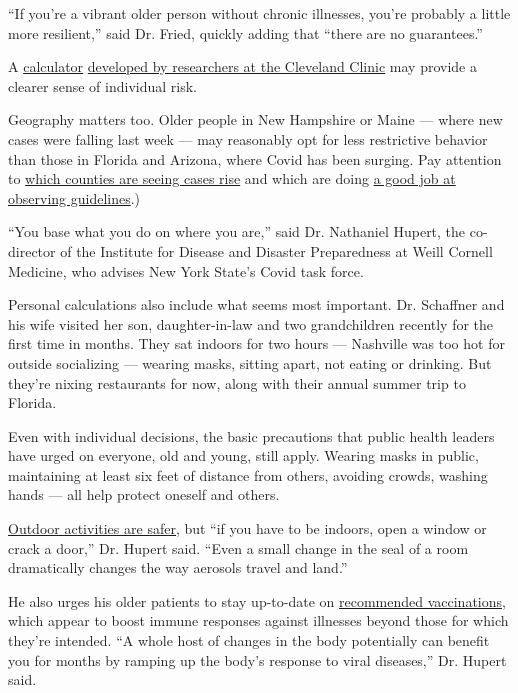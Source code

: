 ``If you're a vibrant older person without chronic illnesses, you're
probably a little more resilient,'' said Dr. Fried, quickly adding that
``there are no guarantees.''

A \href{https://riskcalc.org/COVID19/}{calculator}
\href{https://pubmed.ncbi.nlm.nih.gov/32533957/}{developed by
researchers at the Cleveland Clinic} may provide a clearer sense of
individual risk.

Geography matters too. Older people in New Hampshire or Maine --- where
new cases were falling last week --- may reasonably opt for less
restrictive behavior than those in Florida and Arizona, where Covid has
been surging. Pay attention to
\href{https://www.nytimes3xbfgragh.onion/interactive/2020/us/coronavirus-us-cases.html}{which
counties are seeing cases rise} and which are doing
\href{https://www.unacast.com/covid19/social-distancing-scoreboard}{a
good job at observing guidelines}.)

``You base what you do on where you are,'' said Dr. Nathaniel Hupert,
the co-director of the Institute for Disease and Disaster Preparedness
at Weill Cornell Medicine, who advises New York State's Covid task
force.

Personal calculations also include what seems most important. Dr.
Schaffner and his wife visited her son, daughter-in-law and two
grandchildren recently for the first time in months. They sat indoors
for two hours --- Nashville was too hot for outside socializing ---
wearing masks, sitting apart, not eating or drinking. But they're nixing
restaurants for now, along with their annual summer trip to Florida.

Even with individual decisions, the basic precautions that public health
leaders have urged on everyone, old and young, still apply. Wearing
masks in public, maintaining at least six feet of distance from others,
avoiding crowds, washing hands --- all help protect oneself and others.

\href{https://www.nytimes3xbfgragh.onion/2020/05/15/us/coronavirus-what-to-do-outside.html}{Outdoor
activities are safer,} but ``if you have to be indoors, open a window or
crack a door,'' Dr. Hupert said. ``Even a small change in the seal of a
room dramatically changes the way aerosols travel and land.''

He also urges his older patients to stay up-to-date on
\href{https://www.cdc.gov/vaccines/schedules/hcp/imz/adult.html\#table-age}{recommended
vaccinations}, which appear to boost immune responses against illnesses
beyond those for which they're intended. ``A whole host of changes in
the body potentially can benefit you for months by ramping up the body's
response to viral diseases,'' Dr. Hupert said.

